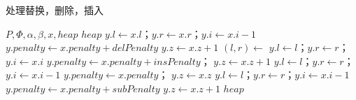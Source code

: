 \documentclass[UTF8,adobefonts]{ctexart}
\begin{document}
\begin{algorithm}
    \caption{处理替换，删除，插入}
    \label{alg:process}
    \begin{algorithmic}[1]
        \Require $P,\Phi,\alpha,\beta,x,heap$
        \Ensure $heap$
        \State $y.l\gets x.l$；$y.r\gets x.r$；$y.i\gets x.i-1$  
        \State $y.penalty \gets x.penalty+delPenalty$
        \State $y.z\gets x.z+1$
        \State {}
            \State $(l,r)\gets$
                \State $y.l\gets l$；$y.r\gets r$；$y.i\gets x.i$ 
                \State $y.penalty\gets x.penalty+insPenalty$；
                \State $y.z \gets x.z+1$
                \State {}
                  
                    \State $y.l\gets l$；$y.r\gets r$；$y.i\gets x.i-1$
                    \State $y.penalty\gets x.penalty$；
                    \State $y.z\gets x.z$
                    \State {}
                \Else   {}
                    \State $y.l\gets l$；$y.r\gets r$；$y.i\gets x.i-1$
                    \State $y.penalty\gets x.penalty+subPenalty$
                    \State $y.z\gets x.z+1$
                    \State {}
                \EndIf
            \EndIf
        \EndFor
        \State \Return $heap$
        \EndFunction
   \end{algorithmic}
\end{algorithm}
\end{document}
